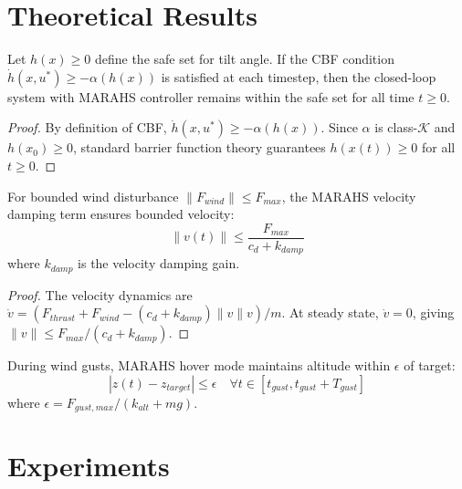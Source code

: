 \documentclass[10pt,twocolumn]{article}
\begin{document}
\section{Theoretical Results}

\begin{theorem}
\label{thm:cbf}
Let $h(x) \geq 0$ define the safe set for tilt angle. If the CBF condition $\dot{h}(x, u^*) \geq -\alpha(h(x))$ is satisfied at each timestep, then the closed-loop system with MARAHS controller remains within the safe set for all time $t \geq 0$.
\end{theorem}

\begin{proof}
By definition of CBF, $\dot{h}(x, u^*) \geq -\alpha(h(x))$. Since $\alpha$ is class-$\mathcal{K}$ and $h(x_0) \geq 0$, standard barrier function theory \cite{ames2014control} guarantees $h(x(t)) \geq 0$ for all $t \geq 0$.
\end{proof}

\begin{theorem}
\label{thm:wind}
For bounded wind disturbance $\|F_{wind}\| \leq F_{max}$, the MARAHS velocity damping term ensures bounded velocity:
\begin{equation}
    \|v(t)\| \leq \frac{F_{max}}{c_d + k_{damp}}
\end{equation}
where $k_{damp}$ is the velocity damping gain.
\end{theorem}

\begin{proof}
The velocity dynamics are $\dot{v} = (F_{thrust} + F_{wind} - (c_d + k_{damp})\|v\|v)/m$. At steady state, $\dot{v} = 0$, giving $\|v\| \leq F_{max}/(c_d + k_{damp})$.
\end{proof}

\begin{theorem}
\label{thm:gust}
During wind gusts, MARAHS hover mode maintains altitude within $\epsilon$ of target:
\begin{equation}
    |z(t) - z_{target}| \leq \epsilon \quad \forall t \in [t_{gust}, t_{gust} + T_{gust}]
\end{equation}
where $\epsilon = F_{gust,max}/(k_{alt} + mg)$.
\end{theorem}

\section{Experiments}
\end{document}
